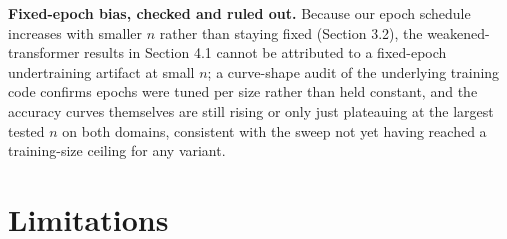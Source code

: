 \documentclass[11pt,letterpaper]{article}
\begin{document}
\begin{table}[!htbp]
\centering
\small
{}
\caption{Measured wall-clock CPU cost and accuracy gap between full-strength DistilBERT and TF-IDF+LR, from the prior companion experiment on Rotten Tomatoes/SST-2. ``Extra labels'' is a linear extrapolation beyond the tested range and should be read as illustrative, not as a validated estimate.}
\label{tab:cost}
\end{table}

\textbf{Fixed-epoch bias, checked and ruled out.} Because our epoch schedule increases with smaller $n$ rather than staying fixed (Section 3.2), the weakened-transformer results in Section 4.1 cannot be attributed to a fixed-epoch undertraining artifact at small $n$; a curve-shape audit of the underlying training code confirms epochs were tuned per size rather than held constant, and the accuracy curves themselves are still rising or only just plateauing at the largest tested $n$ on both domains, consistent with the sweep not yet having reached a training-size ceiling for any variant.

\section{Limitations}
\end{document}
